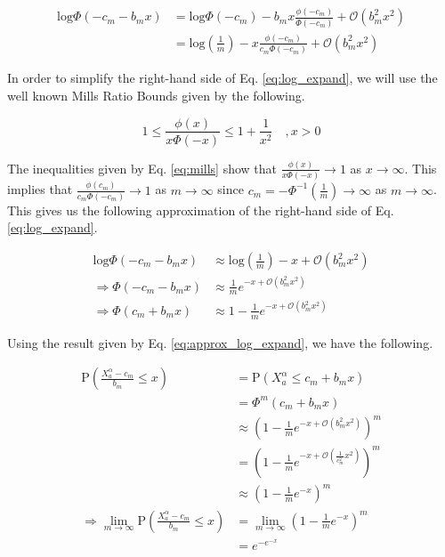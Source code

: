 \documentclass[10pt,letterpaper]{article}\usepackage[]{graphicx}\usepackage[]{color}
\begin{document}
\begin{equation}\label{eq:log_expand}
\begin{aligned}
\text{log}\Phi(-c_m - b_m x) &= \text{log}\Phi(-c_m) - b_m x \frac{\phi(-c_m)}{\Phi(-c_m)} + \mathcal{O}(b^2_m x^2) \\
&= \text{log}\left(\frac{1}{m}\right) - x \frac{\phi(-c_m)}{c_m \Phi(-c_m)} + \mathcal{O}(b^2_m x^2)
\end{aligned}
\end{equation}

In order to simplify the right-hand side of Eq. \ref{eq:log_expand}, we will use the well known Mills Ratio Bounds \cite{chatterjee2014} given by the following.

\begin{equation}\label{eq:mills}
1 \leq \frac{\phi(x)}{x \Phi(-x)} \leq 1 + \frac{1}{x^2} \quad , x > 0
\end{equation}

The inequalities given by Eq. \ref{eq:mills} show that $\frac{\phi(x)}{x \Phi(-x)} \rightarrow 1$ as $x \rightarrow \infty$. This implies that $\frac{\phi(c_m)}{c_m \Phi(-c_m)} \rightarrow 1$ as $m \rightarrow \infty$ since $c_m = -\Phi^{-1}\left(\frac{1}{m}\right) \rightarrow \infty$ as $m \rightarrow \infty$. This gives us the following approximation of the right-hand side of Eq. \ref{eq:log_expand}.

\begin{equation}\label{eq:approx_log_expand}
\begin{aligned}
\text{log}\Phi(-c_m - b_m x) &\approx \text{log}\left(\frac{1}{m}\right) - x + \mathcal{O}(b^2_m x^2) \\
\Rightarrow \Phi(-c_m - b_m x) &\approx \frac{1}{m}e^{-x + \mathcal{O}(b^2_m x^2)} \\
\Rightarrow \Phi(c_m + b_m x) &\approx 1 - \frac{1}{m}e^{-x + \mathcal{O}(b^2_m x^2)}
\end{aligned}
\end{equation}

Using the result given by Eq. \ref{eq:approx_log_expand}, we have the following.


\begin{equation}\label{eq:prob_normal_max}
\begin{aligned}
\text{P}\left(\frac{X^\alpha_a - c_m}{b_m} \leq x\right) &= \text{P}(X^\alpha_a \leq c_m + b_m x) \\
&= \Phi^m(c_m + b_m x) \\
&\approx \left(1 - \frac{1}{m}e^{-x + \mathcal{O}(b^2_m x^2)}\right)^m \\
&= \left(1 - \frac{1}{m}e^{-x + \mathcal{O}\left(\frac{1}{c^2_m} x^2\right)}\right)^m \\
&\approx \left(1 - \frac{1}{m}e^{-x}\right)^m \\
\Rightarrow \lim_{m \to \infty} \text{P}\left(\frac{X^\alpha_a - c_m}{b_m} \leq x\right) &= \lim_{m \to \infty} \left(1 - \frac{1}{m}e^{-x}\right)^m \\
&= e^{-e^{-x}}
\end{aligned}
\end{equation}
\end{document}
